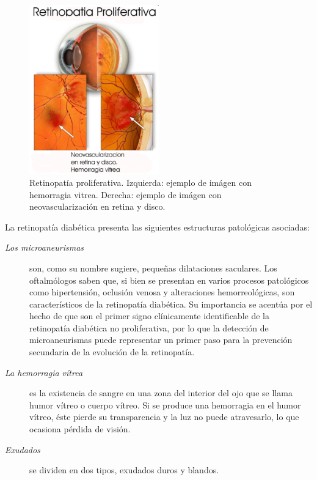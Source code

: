 \begin{description}
\begin{description}
\begin{figure}[H]
	{
	\centering
	\includegraphics[width=0.5\textwidth]{Figures/RetinopatiaPrliferativa}
	\caption[Retinopat\'ia diab\'etica]{Retinopat\'ia proliferativa. Izquierda: ejemplo de im\'agen con hemorragia vitrea. Derecha: ejemplo de im\'agen con neovascularizaci\'on en retina y disco.}
	\label{fig:RetinopatiaProliferativa}
	}
\end{figure}
\end{description}
La retinopat\'ia diab\'etica presenta las siguientes estructuras patol\'ogicas asociadas:
\begin{description}
\item[\normalfont\textit{Los microaneurismas}] son, como su nombre sugiere, pequeñas dilataciones saculares. Los oftalm\'ologos saben que, si bien se presentan en varios procesos patol\'ogicos como hipertensi\'on, oclusi\'on venosa y alteraciones hemorreol\'ogicas, son caracter\'isticos de la retinopat\'ia diab\'etica. Su importancia se acent\'ua por el hecho de que son el primer signo cl\'inicamente identificable de la retinopat\'ia diab\'etica no proliferativa, por lo que la detecci\'on de microaneurismas puede representar un primer paso para la prevenci\'on secundaria de la evoluci\'on de la retinopat\'ia.
\item[\normalfont\textit{La hemorragia v\'itrea}] es la existencia de sangre en una zona del interior del ojo que se llama humor v\'itreo o cuerpo v\'itreo. Si se produce una hemorragia en el humor v\'itreo, \'este pierde su transparencia y la luz no puede atravesarlo, lo que ocasiona p\'erdida de visi\'on.
\item[\normalfont\textit{Exudados}] se dividen en dos tipos, exudados duros y blandos.
\begin{description}

\end{description}
\end{description}
\end{description}
